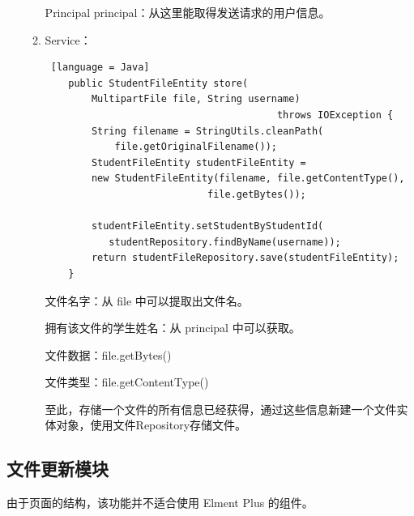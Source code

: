 \begin{enumerate}
\begin{enumerate}
                Principal principal：从这里能取得发送请求的用户信息。
          \item Service：
                \begin{lstlisting} [language = Java]
    public StudentFileEntity store(
        MultipartFile file, String username) 
                                        throws IOException {
        String filename = StringUtils.cleanPath(
            file.getOriginalFilename());
        StudentFileEntity studentFileEntity = 
        new StudentFileEntity(filename, file.getContentType(), 
                            file.getBytes());

        studentFileEntity.setStudentByStudentId(
           studentRepository.findByName(username));
        return studentFileRepository.save(studentFileEntity);
    }
        \end{lstlisting}
                文件名字：从 file 中可以提取出文件名。

                拥有该文件的学生姓名：从 principal 中可以获取。

                文件数据：file.getBytes()

                文件类型：file.getContentType()

                至此，存储一个文件的所有信息已经获得，通过这些信息新建一个文件实体对象，使用文件Repository存储文件。
        \end{enumerate}
\end{enumerate}

\subsection{文件更新模块}

由于页面的结构，该功能并不适合使用 Elment Plus 的组件。

